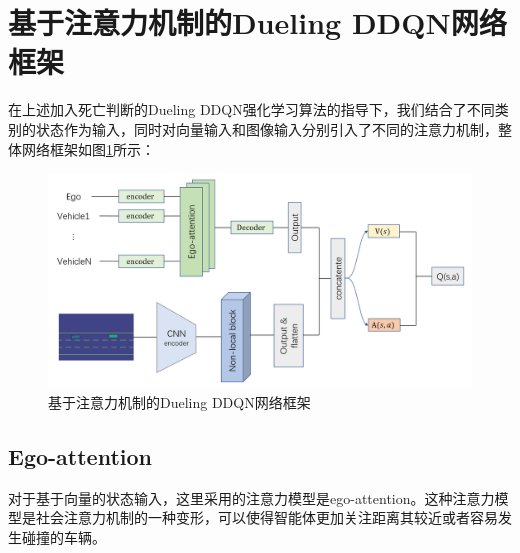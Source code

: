 \documentclass[letterpaper, 10 pt, conference]{ieeeconf}  %
\begin{document}
\section{基于注意力机制的Dueling DDQN网络框架}
在上述加入死亡判断的Dueling DDQN强化学习算法的指导下，我们结合了不同类别的状态作为输入，同时对向量输入和图像输入分别引入了不同的注意力机制，整体网络框架如图\ref{fig:总体架构}所示：

\begin{figure}[htbp]
    \centering
    \includegraphics[width=\linewidth]{fig/总体架构.png}
    \caption{基于注意力机制的Dueling DDQN网络框架\cite{wang2021highway}}
    \label{fig:总体架构}
  \end{figure}

\subsection{Ego-attention}
对于基于向量的状态输入，这里采用的注意力模型是ego-attention\cite{leurent2019social}。这种注意力模型是社会注意力机制的一种变形，可以使得智能体更加关注距离其较近或者容易发生碰撞的车辆。
\end{document}
